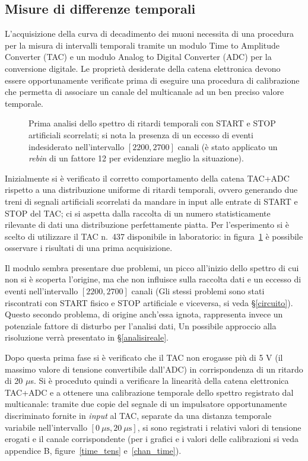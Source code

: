 \documentclass[10pt, oneside, a4paper]{article}   	%
\begin{document}
%
\subsection{Misure di differenze temporali}\label{tac}
L'acquisizione della curva di decadimento dei muoni necessita di una procedura per la misura di intervalli temporali tramite un modulo Time to Amplitude Converter (TAC) e un modulo Analog to Digital Converter (ADC) per la conversione digitale. Le proprietà desiderate della catena elettronica devono essere opportunamente verificate prima di eseguire una procedura di calibrazione che permetta di associare un canale del multicanale ad un ben preciso valore temporale.
%
\begin{figure}[b!]
  \centering  
  
  \caption{Prima analisi dello spettro di ritardi temporali con START e STOP artificiali scorrelati; si nota la presenza di un eccesso di eventi indesiderato nell'intervallo $[2200,2700]$ canali (è stato applicato un \emph{rebin} di un fattore 12 per evidenziare meglio la situazione).}
  \label{rumore1}
\end{figure}
%

Inizialmente si è verificato il corretto comportamento della catena TAC+ADC rispetto a una distribuzione uniforme di ritardi temporali, ovvero generando due treni di segnali artificiali scorrelati da mandare in input alle entrate di START e STOP del TAC; ci si aspetta dalla raccolta di un numero statisticamente rilevante di dati una distribuzione perfettamente piatta. Per l'esperimento si è scelto di utilizzare il TAC n.~437 disponibile in laboratorio: in figura~\ref{rumore1} è possibile osservare i risultati di una prima acquisizione.

Il modulo sembra presentare due problemi, un picco all'inizio dello spettro di cui non si è scoperta l'origine, ma che non influisce sulla raccolta dati e un eccesso di eventi nell'intervallo $[2200,2700]$ canali (Gli stessi problemi sono stati riscontrati con START fisico e STOP artificiale e viceversa, si veda \S\ref{circuito}). Questo secondo problema, di origine anch'essa ignota, rappresenta invece un potenziale fattore di disturbo per l'analisi dati, Un possibile approccio alla risoluzione verrà presentato in \S\ref{analisireale}.

Dopo questa prima fase si è verificato che il TAC non erogasse più di 5 V (il massimo valore di tensione convertibile dall'ADC) in corrispondenza di un ritardo di 20 $\mu$s. Si è proceduto quindi a verificare la linearità della catena elettronica TAC+ADC e a ottenere una calibrazione temporale dello spettro registrato dal multicanale: tramite due copie del segnale di un impulsatore opportunamente discriminato fornite in \textit{input} al TAC, separate da una distanza temporale variabile nell'intervallo $[0 \ \mu \mbox{s},20 \ \mu \mbox{s}]$, si sono registrati i relativi valori di tensione erogati e il canale corrispondente (per i grafici e i valori delle calibrazioni si veda appendice B, figure~\ref{time_tens} e~\ref{chan_time}).
\end{document}
